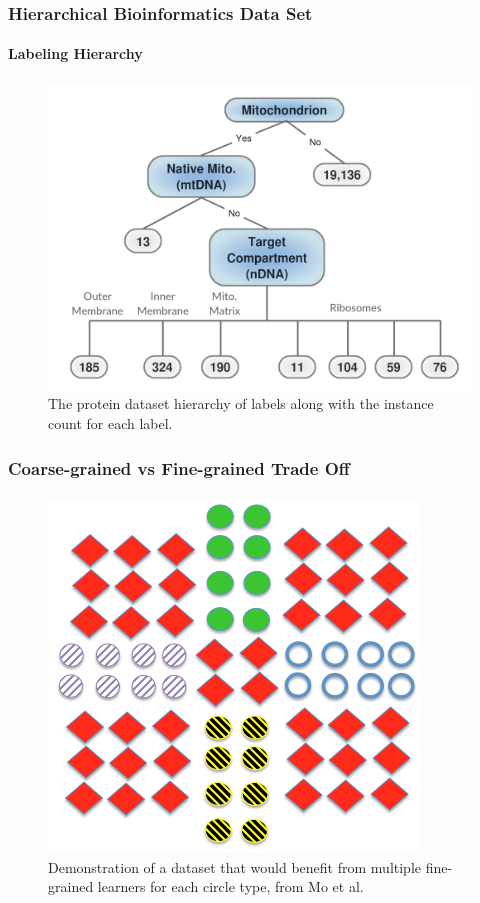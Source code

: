 \documentclass{beamer}
\begin{document}
\begin{frame}
    \frametitle{Hierarchical Bioinformatics Data Set}
    \framesubtitle{Labeling Hierarchy}
    \begin{figure}[!htb]
        \centering
    \includegraphics[width=0.75\columnwidth]{fig/MitoTreeLabels}
        \caption{The protein dataset hierarchy of labels along with the instance
        count for each label.}
        \label{fig:Mitotree}
    \end{figure}
\end{frame}
\begin{frame}
    \frametitle{Coarse-grained vs Fine-grained Trade Off}
    \framesubtitle{}
    \begin{figure}[!htb]
	\centering
    \includegraphics[width=0.5\columnwidth]{fig/union}
    \caption{Demonstration of a dataset that would benefit from multiple fine-grained
    learners for each circle type, from Mo et al.}
    \label{fig:union}
\end{figure}
\end{frame}
\end{document}
